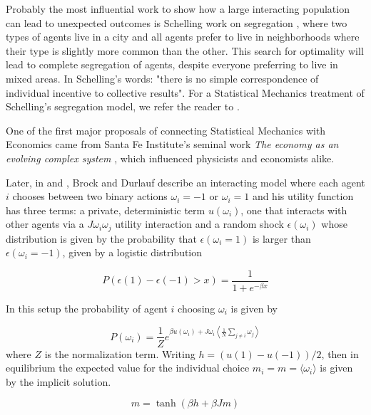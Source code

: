 Probably the most influential work to show how a large interacting population can lead to unexpected outcomes is Schelling work on segregation \cite{schelling1971}, where two types of agents live in a city and all agents prefer to live in neighborhoods where their type is slightly more common than the other. This search for optimality will lead to complete segregation of agents, despite everyone preferring to live in mixed areas. In Schelling's words: "there is no simple correspondence of individual incentive to collective results". For a Statistical Mechanics treatment of Schelling's segregation model, we refer the reader to \cite{dall2008}.

One of the first major proposals of connecting Statistical Mechanics with Economics came from Santa Fe Institute's seminal work \textit{The economy as an evolving complex system} \cite{Anderson88, Arthur97}, which influenced physicists and economists alike. 

Later, in \cite{brock2001a} and \cite{brock2001b}, Brock and Durlauf describe an interacting model where each agent $i$ chooses between two binary actions $\omega_i = -1$ or $\omega_i = 1$ and his utility function has three terms: a private, deterministic term $u(\omega_i)$, one that interacts with other agents via a $J\omega_i \omega_j$ utility interaction and a random shock $\epsilon(\omega_i)$ whose distribution is given by the probability that $\epsilon(\omega_i = 1)$ is larger than $\epsilon(\omega_i = -1)$, given by a logistic distribution

\begin{equation}
P(\epsilon(1) - \epsilon(-1) > x) = \frac{1}{1 + e^{-\beta x}}
\end{equation}

In this setup the probability of agent $i$ choosing $\omega_i$ is given by

\begin{equation}
\label{eq:gibbs_brock}
P(\omega_i) = \frac{1}{Z} e^{\beta u(\omega_i)  + J \omega_i \left \langle\frac{1}{N}\sum_{j\neq i} \omega_j \right \rangle}
\end{equation}
where $Z$ is the normalization term. Writing $h = (u(1) - u(-1)) / 2$, then in equilibrium the expected value for the individual choice $m_i = m = \langle \omega_i \rangle$ is given by the implicit solution.

\begin{equation}
\label{eq:ferromagnet}
m = \tanh (\beta h + \beta J m)
\end{equation}

